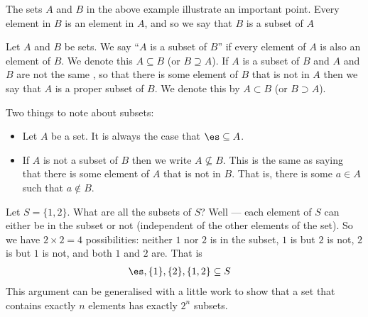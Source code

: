 The sets $A$ and $B$ in the above example illustrate an important point. Every
element in $B$ is an element in $A$, and so we say that $B$ is a subset of $A$
\begin{defn}\label{def_0_3_2}
Let $A$ and $B$ be sets. We say ``$A$ is a subset of $B$'' if every
element of $A$ is also an element of $B$. We denote this $A \subseteq B$ (or $B
\supseteq A$). If $A$ is a subset of $B$ and $A$ and $B$ are not the same , so
that there is some element of $B$ that is not in $A$ then we say that $A$ is a
proper subset of $B$. We denote this by $A \subset B$ (or $B \supset A$).
\end{defn}
Two things to note about subsets:
\begin{itemize}
\item Let $A$ be a set. It is always the case that $\es \subseteq A$.
\item If $A$ is not a subset of $B$ then we write $A \not\subseteq B$. This is
the same as saying that there is some element of $A$ that is not in $B$. That
is, there is some $a \in A$ such that $a \notin B$.
\end{itemize}
\begin{eg}[subsets]\label{eg_0_3_2}
Let $S = \{1,2\}$. What are all the subsets of $S$? Well --- each element of
$S$ can either be in the subset or not (independent of the other elements of
the set). So we have $2\times2 = 4$ possibilities: neither $1$ nor $2$ is in the
subset, $1$ is but $2$ is not, $2$ is but $1$ is not, and both $1$ and $2$ are.
That is
\begin{align*}
  \es, \{1\}, \{2\}, \{1,2\} & \subseteq S
\end{align*}
This argument can be generalised with a little work to show that a set that
contains exactly $n$ elements has exactly $2^n$ subsets.
\end{eg}


